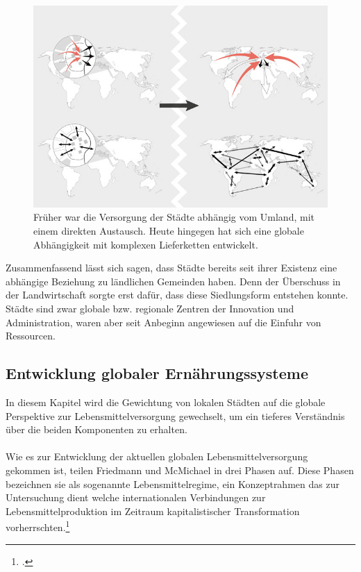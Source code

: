 \documentclass{scrartcl}
\begin{document}
\begin{figure}[h]
\centering
\includegraphics[width=12cm]{image_folder/connections_1.jpg}
\caption{Früher war die Versorgung der Städte abhängig vom Umland, mit einem direkten Austausch. Heute hingegen hat sich eine globale Abhängigkeit mit komplexen Lieferketten entwickelt.}
\label{fig:verbindungen}
\end{figure}

Zusammenfassend lässt sich sagen, dass Städte bereits seit ihrer Existenz eine abhängige Beziehung zu ländlichen Gemeinden haben. Denn der Überschuss in der Landwirtschaft sorgte erst dafür, dass diese Siedlungsform entstehen konnte. Städte sind zwar globale bzw. regionale Zentren der Innovation und Administration, waren aber seit Anbeginn angewiesen auf die Einfuhr von Ressourcen. 

\subsection{Entwicklung globaler Ernährungssysteme}
In diesem Kapitel wird die Gewichtung von lokalen Städten auf die globale Perspektive zur Lebensmittelversorgung gewechselt, um ein tieferes Verständnis über die beiden Komponenten zu erhalten.
\\
\\
Wie es zur Entwicklung der aktuellen globalen Lebensmittelversorgung gekommen ist, teilen Friedmann und McMichael in drei Phasen auf. Diese Phasen bezeichnen sie als sogenannte Lebensmittelregime, ein Konzeptrahmen das zur Untersuchung dient welche internationalen Verbindungen zur Lebensmittelproduktion im Zeitraum kapitalistischer Transformation vorherrschten.\footcite[Vgl.][S.95]{Friedmann1989AGRICULTUREPresent}
\end{document}
